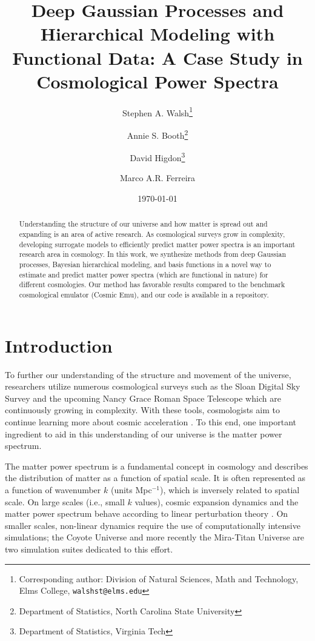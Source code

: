 \documentclass[11pt]{article}
\title{Deep Gaussian Processes and Hierarchical Modeling with Functional Data: A Case Study in Cosmological Power Spectra}
\author{Stephen A. Walsh\thanks{Corresponding author: Division of Natural Sciences, 
        Math and Technology, Elms College, {\tt walshst@elms.edu}} \and 
        Annie S. Booth\thanks{Department of Statistics, North Carolina State University} \and
        David Higdon\thanks{Department of Statistics, Virginia Tech} \and
        Marco A.R. Ferreira\footnotemark[3]}
\date{\today}
\begin{document}
\maketitle
\bigskip

\begin{abstract} 
Understanding the structure of our universe and how matter is spread out and expanding is an area of active research. As cosmological surveys grow in complexity, developing surrogate models to efficiently predict matter power spectra is an important research area in cosmology. In this work, we synthesize methods from deep Gaussian processes, Bayesian hierarchical modeling, and basis functions in a novel way to estimate and predict matter power spectra (which are functional in nature) for different cosmologies. Our method has favorable results compared to the benchmark cosmological emulator (Cosmic Emu), and our code is available in a repository.
\end{abstract}


\section{Introduction}

To further our understanding of the structure and movement of the universe, researchers utilize numerous cosmological surveys such as the Sloan Digital Sky Survey \citep{york2000sloan} and the upcoming Nancy Grace Roman Space Telescope \citep{Dore2019WFIRST} which are continuously growing in complexity. With these tools, cosmologists aim to continue learning more about cosmic acceleration \citep{caldwell2009physics}. To this end, one important ingredient to aid in this understanding of our universe is the matter power spectrum. 

The matter power spectrum is a fundamental concept in cosmology and describes the distribution of matter as a function of spatial scale. It is often represented as a function of wavenumber $k$ (units Mpc$^{-1}$), which is inversely related to spatial scale. On large scales (i.e., small $k$ values), cosmic expansion dynamics and the matter power spectrum behave according to linear perturbation theory \citep{pietroni2008flowing, lesgourgues2009non}. On smaller scales, non-linear dynamics require the use of computationally intensive simulations; the Coyote Universe \citep{lawrence2010coyote} and more recently the Mira-Titan Universe \citep{moran2023mira} are two simulation suites dedicated to this effort. 
\end{document}
